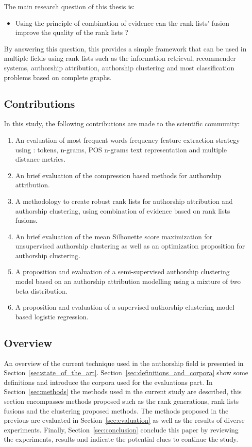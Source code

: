 The main research question of this thesis is:

\begin{itemize}
  \item Using the principle of combination of evidence can the rank lists' fusion improve the quality of the rank lists ?
\end{itemize}

By answering this question, this provides a simple framework that can be used in multiple fields using rank lists such as the information retrieval, recommender systems, authorship attribution, authorship clustering and most classification problems based on complete graphs.

\subsection{Contributions}

In this study, the following contributions are made to the scientific community:

\begin{enumerate}
  \item An evaluation of most frequent words frequency feature extraction strategy using : tokens, n-grams, POS n-grams text representation and multiple distance metrics.
  \item An brief evaluation of the compression based methods for authorship attribution.
  \item A methodology to create robust rank lists for authorship attribution and authorship clustering, using combination of evidence based on rank lists fusions.
  \item An brief evaluation of the mean Silhouette score maximization for unsupervised authorship clustering as well as an optimization proposition for authorship clustering.
  \item A proposition and evaluation of a semi-supervised authorship clustering model based on an authorship attribution modelling using a mixture of two beta distribution.
  \item A proposition and evaluation of a supervised authorship clustering model based logistic regression.
\end{enumerate}

\subsection{Overview}

An overview of the current technique used in the authorship field is presented in Section~\ref{sec:state_of_the_art}.
Section~\ref{sec:definitions_and_corpora} show some definitions and introduce the corpora used for the evaluations part.
In Section~\ref{sec:methods} the methods used in the current study are described, this section encompasses methods proposed such as the rank generations, rank lists fusions and the clustering proposed methods.
The methods proposed in the previous are evaluated in Section~\ref{sec:evaluation} as well as the results of diverse experiments.
Finally, Section~\ref{sec:conclusion} conclude this paper by reviewing the experiments, results and indicate the potential clues to continue the study.
